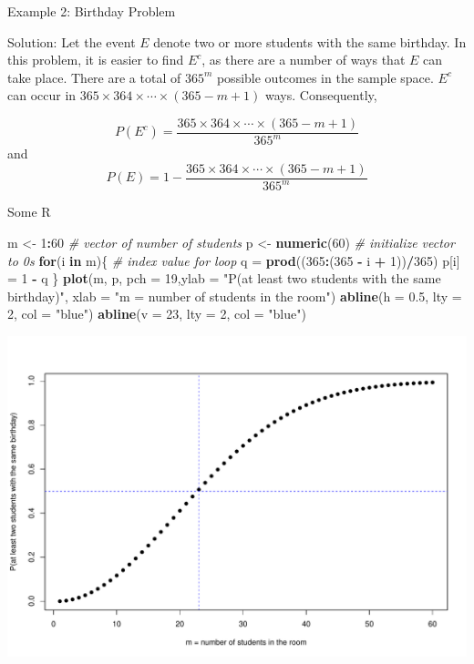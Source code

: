 \documentclass[
  ignorenonframetext,
]{beamer}
\newenvironment{Shaded}{\begin{snugshade}}{\end{snugshade}}
\newcommand{\AttributeTok}[1]{\textcolor[rgb]{0.13,0.29,0.53}{#1}}
\newcommand{\CommentTok}[1]{\textcolor[rgb]{0.56,0.35,0.01}{\textit{#1}}}
\newcommand{\ControlFlowTok}[1]{\textcolor[rgb]{0.13,0.29,0.53}{\textbf{#1}}}
\newcommand{\DecValTok}[1]{\textcolor[rgb]{0.00,0.00,0.81}{#1}}
\newcommand{\FloatTok}[1]{\textcolor[rgb]{0.00,0.00,0.81}{#1}}
\newcommand{\FunctionTok}[1]{\textcolor[rgb]{0.13,0.29,0.53}{\textbf{#1}}}
\newcommand{\NormalTok}[1]{#1}
\newcommand{\OtherTok}[1]{\textcolor[rgb]{0.56,0.35,0.01}{#1}}
\newcommand{\SpecialCharTok}[1]{\textcolor[rgb]{0.81,0.36,0.00}{\textbf{#1}}}
\newcommand{\StringTok}[1]{\textcolor[rgb]{0.31,0.60,0.02}{#1}}
\begin{document}
\begin{frame}{Example 2: Birthday Problem}
\protect\hypertarget{example-2-birthday-problem-1}{}
\begin{tcolorbox}
Solution: Let the event $E$ denote two or more students with the same birthday. In this problem, it is easier to find $E^c$, as there are a number of ways that $E$ can take place. There are a total of $365^m$ possible outcomes in the sample space. $E^c$ can occur in $365\times364\times \cdots \times (365-m+1)$ ways. Consequently,
 
 $$P(E^c)=\frac{365\times 364\times\cdots \times(365-m+1)}{365^m}$$
 and 
 $$P(E)=1-\frac{365\times 364\times \cdots\times(365-m+1)}{365^m}$$
\end{tcolorbox}
\end{frame}

\begin{frame}[fragile]{Some R}
\protect\hypertarget{some-r}{}
\scriptsize

\begin{Shaded}
\begin{Highlighting}[]
\NormalTok{m }\OtherTok{\textless{}{-}} \DecValTok{1}\SpecialCharTok{:}\DecValTok{60}             \CommentTok{\# vector of number of students}
\NormalTok{p }\OtherTok{\textless{}{-}} \FunctionTok{numeric}\NormalTok{(}\DecValTok{60}\NormalTok{)      }\CommentTok{\# initialize vector to 0\textquotesingle{}s}
\ControlFlowTok{for}\NormalTok{(i }\ControlFlowTok{in}\NormalTok{ m)\{          }\CommentTok{\# index value for loop}
\NormalTok{ q }\OtherTok{=} \FunctionTok{prod}\NormalTok{((}\DecValTok{365}\SpecialCharTok{:}\NormalTok{(}\DecValTok{365} \SpecialCharTok{{-}}\NormalTok{ i }\SpecialCharTok{+} \DecValTok{1}\NormalTok{))}\SpecialCharTok{/}\DecValTok{365}\NormalTok{)}
\NormalTok{ p[i] }\OtherTok{=} \DecValTok{1} \SpecialCharTok{{-}}\NormalTok{ q}
\NormalTok{\}}
\FunctionTok{plot}\NormalTok{(m, p, }\AttributeTok{pch =} \DecValTok{19}\NormalTok{,}\AttributeTok{ylab =} \StringTok{"P(at least two students with the same birthday)"}\NormalTok{,}
     \AttributeTok{xlab =} \StringTok{"m = number of students in the room"}\NormalTok{)}
\FunctionTok{abline}\NormalTok{(}\AttributeTok{h =} \FloatTok{0.5}\NormalTok{, }\AttributeTok{lty =} \DecValTok{2}\NormalTok{, }\AttributeTok{col =} \StringTok{"blue"}\NormalTok{)}
\FunctionTok{abline}\NormalTok{(}\AttributeTok{v =} \DecValTok{23}\NormalTok{, }\AttributeTok{lty =} \DecValTok{2}\NormalTok{, }\AttributeTok{col =} \StringTok{"blue"}\NormalTok{)}
\end{Highlighting}
\end{Shaded}

\begin{center}\includegraphics[width=0.3\linewidth,height=0.5\textheight]{Week7_files/figure-beamer/unnamed-chunk-1-1} \end{center}
\normalsize
\end{frame}
\end{document}

